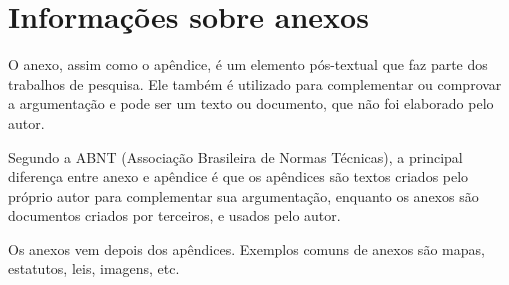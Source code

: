 \chapter{Informações sobre anexos}
\label{an:titulo}

O anexo, assim como o apêndice, é um elemento pós-textual que faz parte dos trabalhos de pesquisa. Ele também é utilizado para complementar ou comprovar a argumentação e pode ser um texto ou documento, que não foi elaborado pelo autor.

Segundo a ABNT (Associação Brasileira de Normas Técnicas), a principal diferença entre anexo e apêndice é que os apêndices são textos criados pelo próprio autor para complementar sua argumentação, enquanto os anexos são documentos criados por terceiros, e usados pelo autor.

Os anexos vem depois dos apêndices. Exemplos comuns de anexos são mapas, estatutos, leis, imagens, etc.